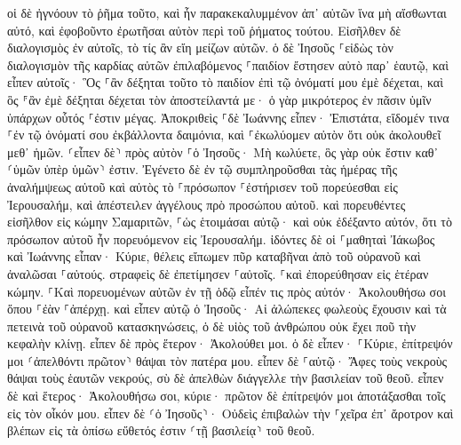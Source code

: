 \documentclass[twoside, 9pt]{extreport}
\begin{document}
οἱ δὲ ἠγνόουν τὸ ῥῆμα τοῦτο, καὶ ἦν παρακεκαλυμμένον ἀπ᾽ αὐτῶν ἵνα μὴ αἴσθωνται αὐτό, καὶ ἐφοβοῦντο ἐρωτῆσαι αὐτὸν περὶ τοῦ ῥήματος τούτου. 
Εἰσῆλθεν δὲ διαλογισμὸς ἐν αὐτοῖς, τὸ τίς ἂν εἴη μείζων αὐτῶν. 
ὁ δὲ Ἰησοῦς ⸀εἰδὼς τὸν διαλογισμὸν τῆς καρδίας αὐτῶν ἐπιλαβόμενος ⸀παιδίον ἔστησεν αὐτὸ παρ᾽ ἑαυτῷ, 
καὶ εἶπεν αὐτοῖς· Ὃς ⸀ἂν δέξηται τοῦτο τὸ παιδίον ἐπὶ τῷ ὀνόματί μου ἐμὲ δέχεται, καὶ ὃς ⸁ἂν ἐμὲ δέξηται δέχεται τὸν ἀποστείλαντά με· ὁ γὰρ μικρότερος ἐν πᾶσιν ὑμῖν ὑπάρχων οὗτός ⸀ἐστιν μέγας. 
Ἀποκριθεὶς ⸀δὲ Ἰωάννης εἶπεν· Ἐπιστάτα, εἴδομέν τινα ⸀ἐν τῷ ὀνόματί σου ἐκβάλλοντα δαιμόνια, καὶ ⸀ἐκωλύομεν αὐτὸν ὅτι οὐκ ἀκολουθεῖ μεθ᾽ ἡμῶν. 
⸂εἶπεν δὲ⸃ πρὸς αὐτὸν ⸀ὁ Ἰησοῦς· Μὴ κωλύετε, ὃς γὰρ οὐκ ἔστιν καθ᾽ ⸂ὑμῶν ὑπὲρ ὑμῶν⸃ ἐστιν. 
Ἐγένετο δὲ ἐν τῷ συμπληροῦσθαι τὰς ἡμέρας τῆς ἀναλήμψεως αὐτοῦ καὶ αὐτὸς τὸ ⸀πρόσωπον ⸀ἐστήρισεν τοῦ πορεύεσθαι εἰς Ἰερουσαλήμ, 
καὶ ἀπέστειλεν ἀγγέλους πρὸ προσώπου αὐτοῦ. καὶ πορευθέντες εἰσῆλθον εἰς κώμην Σαμαριτῶν, ⸀ὡς ἑτοιμάσαι αὐτῷ· 
καὶ οὐκ ἐδέξαντο αὐτόν, ὅτι τὸ πρόσωπον αὐτοῦ ἦν πορευόμενον εἰς Ἰερουσαλήμ. 
ἰδόντες δὲ οἱ ⸀μαθηταὶ Ἰάκωβος καὶ Ἰωάννης εἶπαν· Κύριε, θέλεις εἴπωμεν πῦρ καταβῆναι ἀπὸ τοῦ οὐρανοῦ καὶ ἀναλῶσαι ⸀αὐτούς. 
στραφεὶς δὲ ἐπετίμησεν ⸀αὐτοῖς. 
⸀καὶ ἐπορεύθησαν εἰς ἑτέραν κώμην. 
⸀Καὶ πορευομένων αὐτῶν ἐν τῇ ὁδῷ εἶπέν τις πρὸς αὐτόν· Ἀκολουθήσω σοι ὅπου ⸀ἐὰν ⸀ἀπέρχῃ. 
καὶ εἶπεν αὐτῷ ὁ Ἰησοῦς· Αἱ ἀλώπεκες φωλεοὺς ἔχουσιν καὶ τὰ πετεινὰ τοῦ οὐρανοῦ κατασκηνώσεις, ὁ δὲ υἱὸς τοῦ ἀνθρώπου οὐκ ἔχει ποῦ τὴν κεφαλὴν κλίνῃ. 
εἶπεν δὲ πρὸς ἕτερον· Ἀκολούθει μοι. ὁ δὲ εἶπεν· ⸀Κύριε, ἐπίτρεψόν μοι ⸂ἀπελθόντι πρῶτον⸃ θάψαι τὸν πατέρα μου. 
εἶπεν δὲ ⸀αὐτῷ· Ἄφες τοὺς νεκροὺς θάψαι τοὺς ἑαυτῶν νεκρούς, σὺ δὲ ἀπελθὼν διάγγελλε τὴν βασιλείαν τοῦ θεοῦ. 
εἶπεν δὲ καὶ ἕτερος· Ἀκολουθήσω σοι, κύριε· πρῶτον δὲ ἐπίτρεψόν μοι ἀποτάξασθαι τοῖς εἰς τὸν οἶκόν μου. 
εἶπεν δὲ ⸂ὁ Ἰησοῦς⸃· Οὐδεὶς ἐπιβαλὼν τὴν ⸀χεῖρα ἐπ᾽ ἄροτρον καὶ βλέπων εἰς τὰ ὀπίσω εὔθετός ἐστιν ⸂τῇ βασιλείᾳ⸃ τοῦ θεοῦ. 
\end{document}
